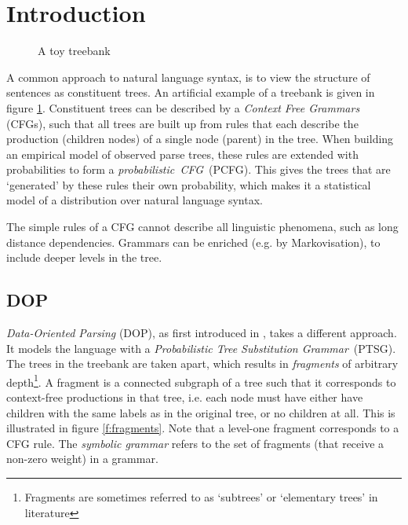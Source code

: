 
\section{Introduction}




\begin{figure}[h!]
\center 
\caption{A toy treebank} \label{f:treebank}
\end{figure}

A common approach to natural language syntax, is to view the structure of sentences as constituent trees. An artificial example of a treebank is given in figure \ref{f:treebank}. Constituent trees can be described by a \emph{Context Free Grammars} (CFGs),  such that all trees are built up from  rules that each describe the production (children nodes) of a single node (parent) in the tree. When building an empirical model of observed parse trees, these rules are extended with probabilities to form a \emph{probabilistic~CFG}~(PCFG). This gives the trees that are `generated' by these rules their own probability, which makes it a statistical model of a distribution over natural language syntax.

The simple rules of a CFG cannot describe all linguistic phenomena, such as long distance dependencies. Grammars can be enriched (e.g. by Markovisation), to include deeper levels in the tree. 


\subsection{DOP}
\emph{Data-Oriented Parsing} (DOP), as first introduced in \cite{scha1990}, takes a different approach. It models the language with a \emph{Probabilistic Tree Substitution Grammar}~(PTSG). 
The trees in the treebank are taken apart, which results in \emph{fragments} of arbitrary depth\footnote{Fragments are sometimes referred to as `subtrees' or `elementary trees' in literature}.
A fragment is a connected subgraph of a tree such that it corresponds to context-free productions in that tree, i.e. each node must have either have children with the same labels as in the original tree, or no children at all. This is illustrated in figure \ref{f:fragments}. Note that a level-one fragment corresponds to a CFG rule. The \emph{symbolic grammar} refers to the set of fragments (that receive a non-zero weight) in a grammar. 



